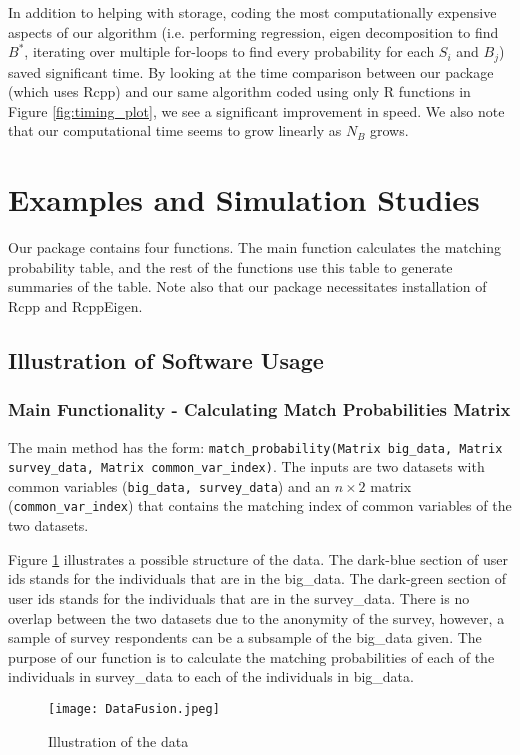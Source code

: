 In addition to helping with storage, coding the most computationally expensive aspects of our algorithm (i.e. performing regression, eigen decomposition to find $B^*$, iterating over multiple for-loops to find every probability for each $S_i$ and $B_j$) saved significant time. By looking at the time comparison between our package (which uses Rcpp) and our same algorithm coded using only R functions in Figure \ref{fig:timing_plot}, we see a significant improvement in speed. We also note that our computational time seems to grow linearly as $N_B$ grows.


\section{Examples and Simulation Studies}
Our package contains four functions. The main function calculates the matching probability table, and the rest of the functions use this table to generate summaries of the table.  Note also that our package necessitates installation of Rcpp and RcppEigen.
\subsection{Illustration of Software Usage}
\subsubsection{Main Functionality - Calculating Match Probabilities Matrix}
The main method has the form: \texttt{match\_probability(Matrix big\_data, Matrix survey\_data, Matrix common\_var\_index)}. 
The inputs are two datasets with common variables (\texttt{big\_data, survey\_data}) and an $n\times2$ matrix (\texttt{common\_var\_index}) that contains the matching index of common variables of the two datasets.

Figure \ref{fig:visualData} illustrates a possible structure of the data. The dark-blue section of user ids stands for the individuals that are in the big\_data. The dark-green section of user ids stands for the individuals that are in the survey\_data. There is no overlap between the two datasets due to the anonymity of the survey, however, a sample of survey respondents can be a subsample of the big\_data given. The purpose of our function is to calculate the matching probabilities of each of the individuals in survey\_data to each of the individuals in big\_data.
\begin{figure}[h!]
\centering
\texttt{[image: DataFusion.jpeg]}
\caption{\label{fig:visualData}Illustration of the data}
\end{figure}

